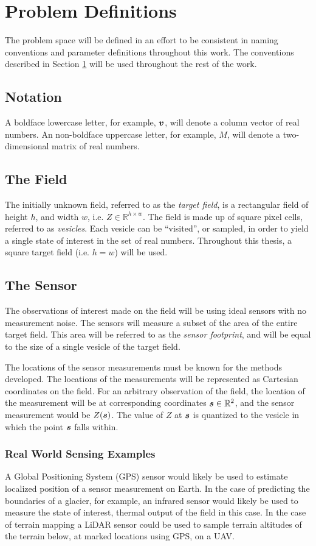 \section{Problem Definitions} \label{ch:defs}
The problem space will be defined in an effort to be consistent in naming conventions and parameter definitions throughout this work. The conventions described in Section \ref{ch:defs} will be used throughout the rest of the work.

\subsection{Notation}
A boldface lowercase letter, for example, ${\it{\boldsymbol{v}}}$, will denote a column vector of real numbers. An non-boldface uppercase letter, for example, $M$, will denote a two-dimensional matrix of real numbers.

\subsection{The Field}
The initially unknown field, referred to as the \textit{target field}, is a rectangular field of height $h$, and width $w$, i.e. $Z \in \mathbb{R}^{h \times w}$. The field is made up of square pixel cells, referred to as \textit{vesicles}. Each vesicle can be ``visited'', or sampled, in order to yield a single state of interest in the set of real numbers. Throughout this thesis, a square target field (i.e. $h = w$) will be used.

\subsection{The Sensor} \label{sec:sensor_measurements}
The observations of interest made on the field will be using ideal sensors with no measurement noise. The sensors will measure a subset of the area of the entire target field. This area will be referred to as the \textit{sensor footprint}, and will be equal to the size of a single vesicle of the target field.

The locations of the sensor measurements must be known for the methods developed. The locations of the measurements will be represented as Cartesian coordinates on the field. For an arbitrary observation of the field, the location of the measurement will be at corresponding coordinates ${\it{\boldsymbol{s}}} \in \mathbb{R}^2$, and the  sensor measurement would be $Z({\it{\boldsymbol{s}}})$. The value of $Z$ at ${\it{\boldsymbol{s}}}$ is quantized to the vesicle in which the point ${\it{\boldsymbol{s}}}$ falls within.

\subsubsection{Real World Sensing Examples}
A Global Positioning System (GPS) sensor would likely be used to estimate localized position of a sensor measurement on Earth. In the case of predicting the boundaries of a glacier, for example, an infrared sensor would likely be used to measure the state of interest, thermal output of the field in this case. In the case of terrain mapping a LiDAR sensor could be used to sample terrain altitudes of the terrain below, at marked locations using GPS, on a UAV.
